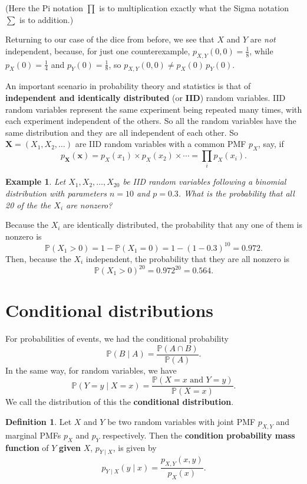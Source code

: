 \documentclass[
  a4paper,
]{book}
\theoremstyle{definition}
\newtheorem{definition}{Definition}[chapter]
\theoremstyle{definition}
\newtheorem{example}{Example}[chapter]
\theoremstyle{definition}
\theoremstyle{definition}
\theoremstyle{remark}
\begin{document}
(Here the Pi notation \(\prod\) is to multiplication exactly what the Sigma notation \(\sum\) is to addition.)

Returning to our case of the dice from before, we see that \(X\) and \(Y\) are \emph{not} independent, because, for just one counterexample, \(p_{X,Y}(0,0) = \frac18\), while \(p_X(0) = \frac14\) and \(p_Y(0) = \frac18\), so \(p_{X,Y}(0,0) \neq p_X(0) \, p_Y(0)\).

An important scenario in probability theory and statistics is that of \textbf{independent and identically distributed} (or \textbf{IID}) random variables. IID random variables represent the same experiment being repeated many times, with each experiment independent of the others. So all the random variables have the same distribution and they are all independent of each other. So \(\mathbf X = (X_1, X_2, \dots )\) are IID random variables with a common PMF \(p_X\), say, if
\[ p_{\mathbf X}(\mathbf x) = p_X(x_1) \times p_X(x_2) \times \cdots = \prod_i p_X(x_i) . \]

\begin{example}
\emph{Let \(X_1, X_2, \dots, X_{20}\) be IID random variables following a binomial distribution with parameters \(n = 10\) and \(p = 0.3\). What is the probability that all 20 of the the \(X_i\) are nonzero?}

Because the \(X_i\) are identically distributed, the probability that any one of them is nonzero is
\[ \mathbb P(X_1 > 0) = 1 - \mathbb P(X_1 = 0) = 1 - (1 - 0.3)^{10} = 0.972 . \]
Then, because the \(X_i\) independent, the probability that they are all nonzero is
\[ \mathbb P(X_1 > 0)^{20} = 0.972^{20} = 0.564. \]
\end{example}

\hypertarget{cond-rv}{%
\section{Conditional distributions}\label{cond-rv}}

For probabilities of events, we had the conditional probability
\[ \mathbb P(B \mid A) = \frac{\mathbb P(A \cap B)}{\mathbb P(A)} . \]
In the same way, for random variables, we have
\[ \mathbb P(Y = y \mid X = x) = \frac{\mathbb P(X = x \text{ and } Y = y)}{\mathbb P(X = x)} . \]
We call the distribution of this the \textbf{conditional distribution}.

\begin{definition}
Let \(X\) and \(Y\) be two random variables with joint PMF \(p_{X,Y}\) and marginal PMFs \(p_X\) and \(p_Y\) respectively. Then the \textbf{condition probability mass function} of \(Y\) \textbf{given} \(X\), \(p_{Y \mid X}\), is given by
\[ p_{Y \mid X}(y \mid x) = \frac{p_{X,Y}(x,y)}{p_X(x)} .   \]
\end{definition}
\end{document}
